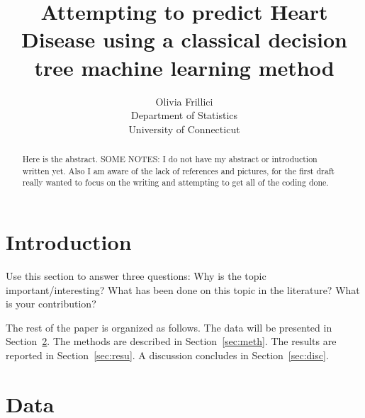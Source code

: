 \documentclass[12pt]{article}
\title{Attempting to predict Heart Disease using a classical decision tree machine learning method }
\author{Olivia Frillici\\
  Department of Statistics\\
  University of Connecticut
}
\begin{document}
\maketitle
\begin{abstract}
    Here is the abstract. 
    SOME NOTES: I do not have my abstract or introduction written yet. Also I am aware of the lack of references and pictures, for the first draft really wanted to focus on the writing and attempting to get all of the coding done. 
    \end{abstract}
    
    
    \section{Introduction}
    \label{sec:intro}
    
    Use this section to answer three questions:
    Why is the topic important/interesting?
    What has been done on this topic in the literature?
    What is your contribution?

The rest of the paper is organized as follows.
The data will be presented in Section~\ref{sec:data}.
The methods are described in Section~\ref{sec:meth}.
The results are reported in Section~\ref{sec:resu}.
A discussion concludes in Section~\ref{sec:disc}.


\section{Data}
\label{sec:data}
\end{document}
